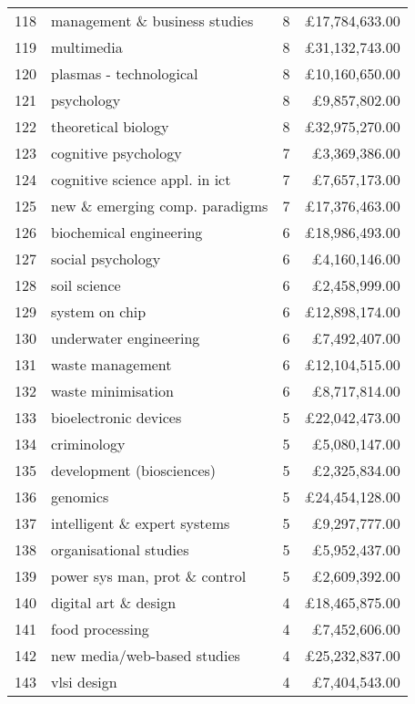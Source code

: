 \begin{spacing}{0.9}
\begin{longtable}[c]{r|>{\raggedleft\arraybackslash}m{6.5cm}|>{\raggedleft\arraybackslash}m{1.9cm}|r}
{118} & {management \& business studies} & {8} & {\pounds17,784,633.00}\\
{119} & {multimedia} & {8} & {\pounds31,132,743.00}\\
{120} & {plasmas - technological} & {8} & {\pounds10,160,650.00}\\
{121} & {psychology} & {8} & {\pounds9,857,802.00}\\
{122} & {theoretical biology} & {8} & {\pounds32,975,270.00}\\
{123} & {cognitive psychology} & {7} & {\pounds3,369,386.00}\\
{124} & {cognitive science appl. in ict} & {7} & {\pounds7,657,173.00}\\
{125} & {new \& emerging comp. paradigms} & {7} & {\pounds17,376,463.00}\\
{126} & {biochemical engineering} & {6} & {\pounds18,986,493.00}\\
{127} & {social psychology} & {6} & {\pounds4,160,146.00}\\
{128} & {soil science} & {6} & {\pounds2,458,999.00}\\
{129} & {system on chip} & {6} & {\pounds12,898,174.00}\\
{130} & {underwater engineering} & {6} & {\pounds7,492,407.00}\\
{131} & {waste management} & {6} & {\pounds12,104,515.00}\\
{132} & {waste minimisation} & {6} & {\pounds8,717,814.00}\\
{133} & {bioelectronic devices} & {5} & {\pounds22,042,473.00}\\
{134} & {criminology} & {5} & {\pounds5,080,147.00}\\
{135} & {development (biosciences)} & {5} & {\pounds2,325,834.00}\\
{136} & {genomics} & {5} & {\pounds24,454,128.00}\\
{137} & {intelligent \& expert systems} & {5} & {\pounds9,297,777.00}\\
{138} & {organisational studies} & {5} & {\pounds5,952,437.00}\\
{139} & {power sys man, prot \& control} & {5} & {\pounds2,609,392.00}\\
{140} & {digital art \& design} & {4} & {\pounds18,465,875.00}\\
{141} & {food processing} & {4} & {\pounds7,452,606.00}\\
{142} & {new media/web-based studies} & {4} & {\pounds25,232,837.00}\\
{143} & {vlsi design} & {4} & {\pounds7,404,543.00}\\

\end{longtable}
\end{spacing}
